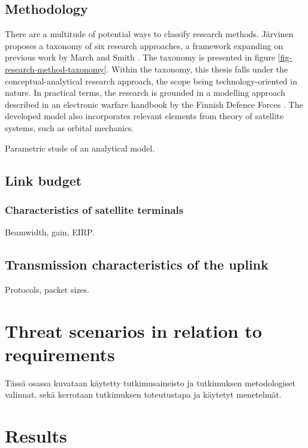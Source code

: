 \documentclass[english, 12pt, a4paper, elec, utf8, a-1b, online]{aaltothesis}
\begin{document}
\subsection{Methodology}

There are a multitude of potential ways to classify research methods. Järvinen \cite{jarvinen} proposes a taxonomy of six research approaches, a framework expanding on previous work by March and Smith \cite{march}.
The taxonomy is presented in figure \ref{fig-research-method-taxonomy}.
Within the taxonomy, this thesis falls under the conceptual-analytical research approach, the scope being technology-oriented in nature.
In practical terms, the research is grounded in a modelling approach described in an electronic warfare handbook by the Finnish Defence Forces \cite{kosola2004elektroninen}.
The developed model also incorporates relevant elements from theory of satellite systems, such as orbital mechanics.

Parametric stude of an analytical model.

\subsection{Link budget}
\subsubsection{Characteristics of satellite terminals}
Beamwidth, gain, EIRP.

\subsection{Transmission characteristics of the uplink}
Protocols, packet sizes.

\section{Threat scenarios in relation to requirements}
T\"ass\"a osassa kuvataan k\"aytetty tutkimusaineisto ja
tutkimuksen metodologiset valinnat, sek\"a
kerrotaan tutkimuksen toteutustapa ja k\"aytetyt menetelm\"at.

\clearpage

\section{Results}
\end{document}
